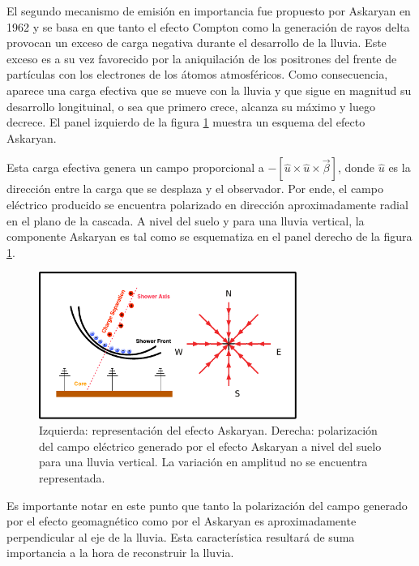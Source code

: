 	El segundo mecanismo de emisión en importancia fue propuesto por Askaryan en 1962 \cite{askaryan1962} y se basa en que tanto el efecto Compton como la generaci\'on de rayos delta provocan un exceso de carga negativa durante el desarrollo de la lluvia.
	Este exceso es a su vez favorecido por la aniquilaci\'on de los positrones del frente de part\'iculas con los electrones de los \'atomos atmosf\'ericos. 
	Como consecuencia, aparece una carga efectiva que se mueve con la lluvia y que sigue en magnitud su desarrollo longituinal, o sea que primero crece, alcanza su m\'aximo y luego decrece.
	El panel izquierdo de la figura \ref{fig:ask_sketch} muestra un esquema del efecto Askaryan.
	
	Esta carga efectiva genera un campo proporcional a $-\left[\hat u \times \hat u \times \vec\beta\right]$\cite{cite:zhsPhysRevD}, donde $\hat u$ es la direcci\'on entre la carga que se desplaza y el observador\cite{jackson:1998}.
	Por ende, el campo eléctrico producido se encuentra polarizado en dirección aproximadamente radial en el plano de la cascada.
	A nivel del suelo y para una lluvia vertical, la componente Askaryan es tal como se esquematiza en el panel derecho de la figura \ref{fig:ask_sketch}.
	\begin{figure}[ht!]
		\centering
		\includegraphics[width=0.75\textwidth]{fig/EASRadio/ask_sketch}
		\caption{\label{fig:ask_sketch} Izquierda: representaci\'on del efecto Askaryan.
		Derecha: polarización del campo eléctrico generado por el efecto Askaryan a nivel del suelo para una lluvia vertical. La variaci\'on en amplitud no se encuentra representada.}
	\end{figure}
	
	Es importante notar en este punto que tanto la polarizaci\'on del campo generado por el efecto geomagn\'etico como por el Askaryan es aproximadamente perpendicular al eje de la lluvia.
	Esta caracter\'istica resultar\'a de suma importancia a la hora de reconstruir la lluvia.
	
